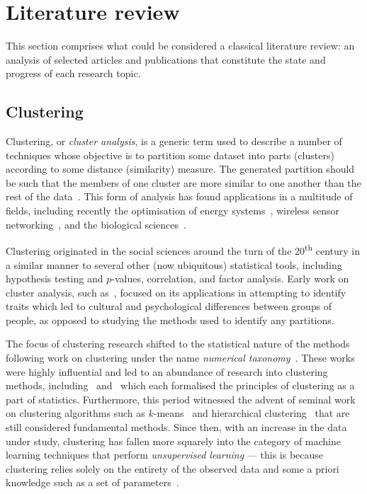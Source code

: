 \section{Literature review}\label{sec:review}

This section comprises what could be considered a classical literature review:
an analysis of selected articles and publications that constitute the state and
progress of each research topic.


\subsection{Clustering}\label{subsec:clustering}
\graphicspath{{img/clusters/}}

Clustering, or \emph{cluster analysis}, is a generic term used to describe a
number of techniques whose objective is to partition some dataset into parts
(clusters) according to some distance (similarity) measure. The generated
partition should be such that the members of one cluster are more similar to one
another than the rest of the data~\cite{Everitt2011}. This form of analysis has
found applications in a multitude of fields, including recently the optimisation
of energy systems~\cite{Jing2019,Teichgraeber2019}, wireless sensor
networking~\cite{Goswami2019}, and the biological
sciences~\cite{Bulut2020,Kiselev2019}.

Clustering originated in the social sciences around the turn of the
20\textsuperscript{th} century in a similar manner to several other (now
ubiquitous) statistical tools, including hypothesis testing and \(p\)-values,
correlation, and factor analysis. Early work on cluster analysis, such
as~\cite{Cattell1943,Driver1932}, focused on its applications in attempting to
identify traits which led to cultural and psychological differences between
groups of people, as opposed to studying the methods used to identify any
partitions.

The focus of clustering research shifted to the statistical nature of the
methods following work on clustering under the name \emph{numerical
taxonomy}~\cite{Sneath1973,Sokal1966}. These works were highly influential and
led to an abundance of research into clustering methods,
including~\cite{Diday1976} and~\cite{Hartigan1975} which each formalised the
principles of clustering as a part of statistics. Furthermore, this period
witnessed the advent of seminal work on clustering algorithms such as
\(k\)-means~\cite{Hartigan1979} and hierarchical
clustering~\cite{Defays1977,Sibson1973} that are still considered fundamental
methods.
Since then, with an increase in the data under study, clustering has fallen more
squarely into the category of machine learning techniques that perform
\emph{unsupervised learning} --- this is because clustering relies solely on the
entirety of the observed data and some a priori knowledge such as a set of
parameters~\cite{Dayan1999}.

